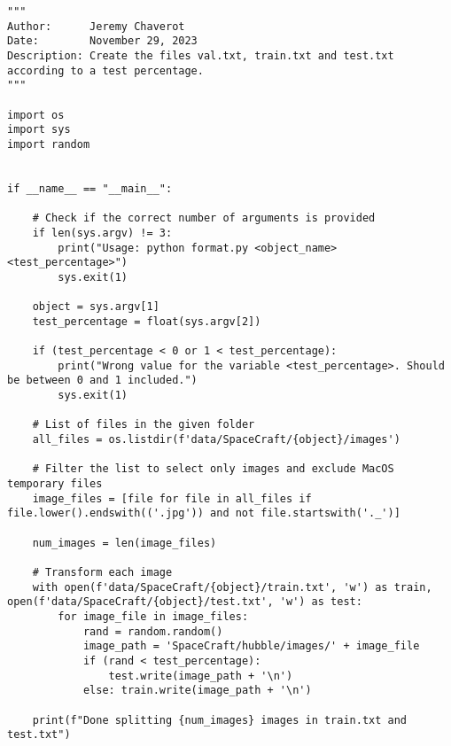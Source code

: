 \begin{lstlisting}[style=pythonstyle, label=lst:2, caption=Python script \texttt{format.py} to randomly generate the training set and the test set based on a specified probability. This script is used when creating both the reference set and the query set from a common set of images. Should be run from Gen6D's root folder.]
"""
Author:      Jeremy Chaverot
Date:        November 29, 2023
Description: Create the files val.txt, train.txt and test.txt according to a test percentage.
"""

import os
import sys
import random


if __name__ == "__main__":

	# Check if the correct number of arguments is provided
    if len(sys.argv) != 3:
        print("Usage: python format.py <object_name> <test_percentage>")
        sys.exit(1)

    object = sys.argv[1]
    test_percentage = float(sys.argv[2])

    if (test_percentage < 0 or 1 < test_percentage):
        print("Wrong value for the variable <test_percentage>. Should be between 0 and 1 included.")
        sys.exit(1)

    # List of files in the given folder
    all_files = os.listdir(f'data/SpaceCraft/{object}/images')

    # Filter the list to select only images and exclude MacOS temporary files
    image_files = [file for file in all_files if file.lower().endswith(('.jpg')) and not file.startswith('._')]

    num_images = len(image_files)

    # Transform each image
    with open(f'data/SpaceCraft/{object}/train.txt', 'w') as train, open(f'data/SpaceCraft/{object}/test.txt', 'w') as test:
        for image_file in image_files:
            rand = random.random()
            image_path = 'SpaceCraft/hubble/images/' + image_file
            if (rand < test_percentage):
                test.write(image_path + '\n')
            else: train.write(image_path + '\n')

    print(f"Done splitting {num_images} images in train.txt and test.txt")
\end{lstlisting}

\cleardoublepage{}

